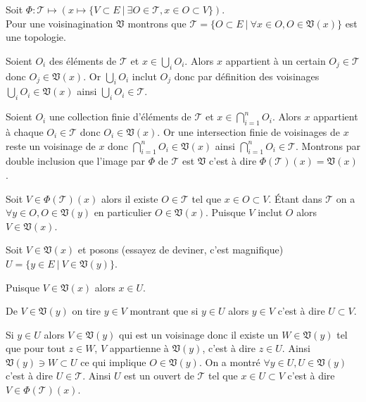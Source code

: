\documentclass[a4paper, 11pt, french]{book}
\newenvironment{itemise}{\itemize}{\enditemize}
\theoremstyle{plain} %
\theoremstyle{definition} %
\theoremstyle{remark} %
\newcommand{\1}{\mathds{1}}
\begin{document}
Soit $\Phi:\mathscr{T}\mapsto(x\mapsto\{V\subset E\ |\ \exists O\in\mathscr{T}, x\in O\subset V\})$. \\
Pour une voisinagination $\mathfrak{V}$ montrons que $\mathscr{T}=\{O\subset E\ |\ \forall x\in O, O\in\mathfrak{V}(x)\}$ est une topologie.
\begin{itemise}
	\item Soient $O_i$ des éléments de $\mathscr{T}$ et $x\in\bigcup_iO_i$.
	Alors $x$ appartient à un certain $O_j\in\mathscr{T}$ donc $O_j\in\mathfrak{V}(x)$.
	Or $\bigcup_iO_i$ inclut $O_j$ donc par définition des voisinages $\bigcup_iO_i\in\mathfrak{V}(x)$ ainsi $\bigcup_iO_i\in\mathscr{T}$.
	\item Soient $O_i$ une collection finie d'éléments de $\mathscr{T}$ et $x\in\bigcap_{i=1}^nO_i$.
	Alors $x$ appartient à chaque $O_i\in\mathscr{T}$ donc $O_i\in\mathfrak{V}(x)$.
	Or une intersection finie de voisinages de $x$ reste un voisinage de $x$ donc $\bigcap_{i=1}^nO_i\in\mathfrak{V}(x)$ ainsi $\bigcap_{i=1}^nO_i\in\mathscr{T}$.
\end{itemise}
Montrons par double inclusion que l'image par $\Phi$ de $\mathscr{T}$ est $\mathfrak{V}$ c'est à dire $\Phi(\mathscr{T})(x)=\mathfrak{V}(x)$.
\begin{itemise}
	\item Soit $V\in\Phi(\mathscr{T})(x)$ alors il existe $O\in\mathscr{T}$ tel que $x\in O\subset V$.
	Étant dans $\mathscr{T}$ on a $\forall y\in O, O\in\mathfrak{V}(y)$ en particulier $O\in\mathfrak{V}(x)$.
	Puisque $V$ inclut $O$ alors $V\in\mathfrak{V}(x)$.
	\item Soit $V\in\mathfrak{V}(x)$ et posons (essayez de deviner, c'est magnifique) $U=\{y\in E\ |\ V\in\mathfrak{V}(y)\}$.
	\begin{itemise}
		\item Puisque $V\in\mathfrak{V}(x)$ alors $x\in U$.
		\item De $V\in\mathfrak{V}(y)$ on tire $y\in V$ montrant que si $y\in U$ alors $y\in V$ c'est à dire $U\subset V$.
		\item Si $y\in U$ alors $V\in\mathfrak{V}(y)$ qui est un voisinage donc il existe un $W\in\mathfrak{V}(y)$ tel que pour tout $z\in W$, $V$ appartienne à $\mathfrak{V}(y)$, c'est à dire $z\in U$.
		Ainsi $\mathfrak{V}(y)\ni W\subset U$ ce qui implique $O\in\mathfrak{V}(y)$.
		On a montré $\forall y\in U, U\in\mathfrak{V}(y)$ c'est à dire $U\in\mathscr{T}$.
	\end{itemise}
	Ainsi $U$ est un ouvert de $\mathscr{T}$ tel que $x\in U\subset V$ c'est à dire $V\in\Phi(\mathscr{T})(x)$.
\end{itemise}
\end{document}
